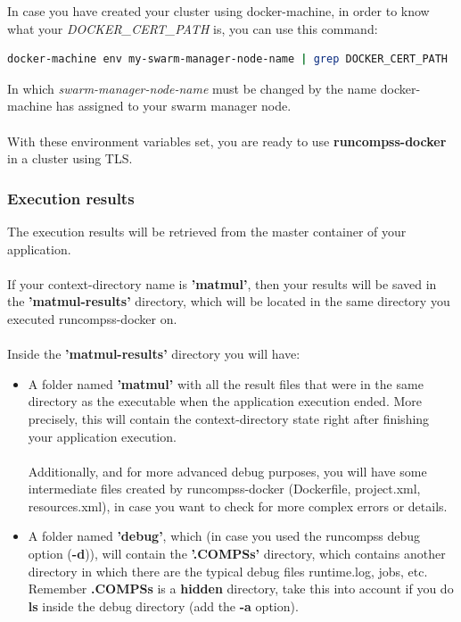 In case you have created your cluster using docker-machine, in order to know what
your \textit{DOCKER\_CERT\_PATH} is, you can use this command:
\begin{lstlisting}[language=bash]
docker-machine env my-swarm-manager-node-name | grep DOCKER_CERT_PATH
\end{lstlisting}
In which \textit{swarm-manager-node-name} must be changed by the name docker-machine has assigned to your swarm manager node.\\ \\
With these environment variables set, you are ready to use \textbf{runcompss-docker} in a cluster using TLS.

\clearpage
\subsubsection{Execution results}
The execution results will be retrieved from the master container of your application.
\\ \\ 
If your context-directory name is \textbf{'matmul'}, then your results will be saved in the \textbf{'matmul-results'} directory, 
which will be located in the same directory you executed runcompss-docker on. 
\\ \\ 
Inside the \textbf{'matmul-results'} directory you will have:
\begin{itemize}
 \item {A folder named \textbf{'matmul'} with all the result files that were
	in the same directory as the executable when the application execution ended.  
	More precisely, this will contain the context-directory state right after finishing your application execution.
	\\
	\\
	Additionally, and for more advanced debug purposes,
	you will have some intermediate files created by runcompss-docker (Dockerfile, project.xml, resources.xml),
	in case you want to check for more complex errors or details. 
	}
	
  \item {A folder named \textbf{'debug'}, which (in case you used the runcompss debug option (\textbf{-d})), 
         will contain the \textbf{'.COMPSs'} directory, which contains another directory in which there are the typical debug files runtime.log, jobs, etc.
	 \\
         Remember \textbf{.COMPSs} is a \textbf{hidden} directory, take this into account if you do \textbf{ls} inside the debug directory (add the \textbf{-a} option).
  }
  
\end{itemize}


